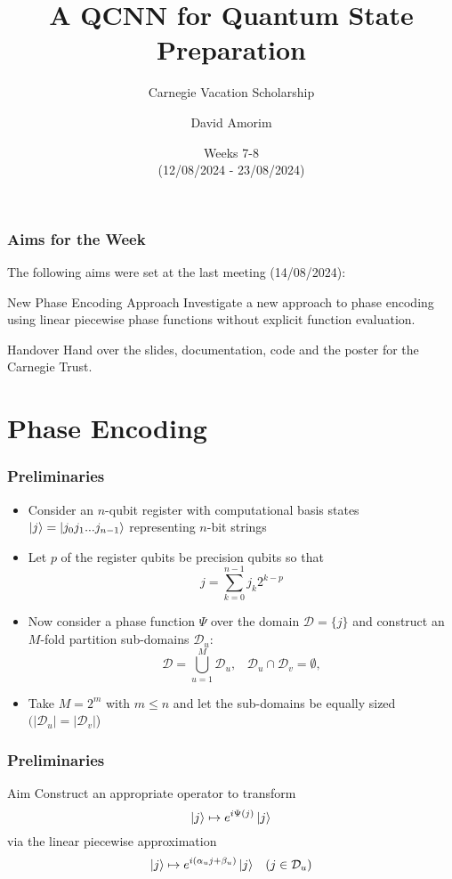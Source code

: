 \documentclass{beamer}
\title[QCNN State Preparation]{A QCNN for Quantum State Preparation}
\subtitle{Carnegie Vacation Scholarship}
\author[David Amorim]{David Amorim}
\institute[]{}
\date[21/08/2024]{Weeks 7-8 \\(12/08/2024 - 23/08/2024)}
\begin{document}
\frame{\titlepage}

\begin{frame}
\frametitle{Aims for the Week}
The following aims were set at the last meeting (14/08/2024):

\begin{alertblock}{New Phase Encoding Approach}
Investigate a new approach to phase encoding using linear piecewise phase functions without explicit function evaluation.  
\end{alertblock}

\begin{alertblock}{Handover}
Hand over the slides, documentation, code and the poster for the Carnegie Trust.
\end{alertblock}
\end{frame}

\section{Phase Encoding}

\begin{frame}
\frametitle{Preliminaries}

\begin{itemize}
\item Consider an \alert{$n$-qubit register} with computational basis states $\ket{j} = \ket{j_0 j_1 ... j_{n-1}}$ representing $n$-bit strings
\item Let \alert{$p$} of the register qubits be \alert{precision qubits} so that 
\begin{equation} 
j = \sum^{n -1}_{k=0} j_k 2^{k-p}
\end{equation}
\item Now consider a \alert{phase function} $\Psi$ over the domain $\mathcal{D} = \{ j \}$ and construct an \alert{$M$-fold partition} sub-domains $\mathcal{D}_u$:
\begin{equation}
\mathcal{D} = \bigcup_{u=1}^M \mathcal{D}_u, \; \; \; \mathcal{D}_u \cap \mathcal{D}_v = \emptyset, 
\end{equation}
\item Take \alert{$M = 2^m$} with $m \leq n$ and let the sub-domains be equally sized $(|\mathcal{D}_u| = |\mathcal{D}_v|$)
\end{itemize}
\end{frame}

\begin{frame}
\frametitle{Preliminaries}
\begin{alertblock}{Aim}
Construct an appropriate operator to transform 
\begin{equation}
\ket{j} \mapsto e^{i \Psi (j)} \ket{j}
\end{equation}
via the linear piecewise approximation
\begin{equation}
\ket{j} \mapsto e^{i (\alpha_u j + \beta_u)} \ket{j} \; \; \; (j \in \mathcal{D}_u)
\end{equation}
\end{alertblock}
\end{frame}
\end{document}
